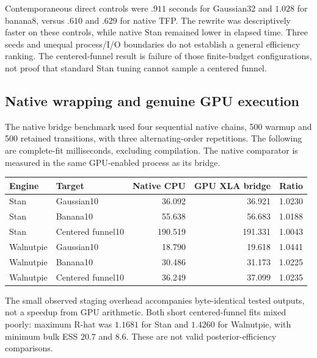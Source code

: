 Contemporaneous direct controls were $.911$ seconds for Gaussian32 and
$1.028$ for banana8, versus $.610$ and $.629$ for native TFP. The rewrite
was descriptively faster on these controls, while native Stan remained
lower in elapsed time. Three seeds and unequal process/I/O boundaries do
not establish a general efficiency ranking. The centered-funnel result is
failure of those finite-budget configurations, not proof that standard Stan
tuning cannot sample a centered funnel.

\subsection{Native wrapping and genuine GPU execution}

The native bridge benchmark used four sequential native chains, 500 warmup
and 500 retained transitions, with three alternating-order repetitions.
The following are complete-fit milliseconds, excluding compilation. The
native comparator is measured in the same GPU-enabled process as its bridge.

\begin{center}\small
\begin{tabular}{llrrr}
\toprule
Engine & Target & Native CPU & GPU XLA bridge & Ratio\\
\midrule
Stan & Gaussian10 & 36.092 & 36.921 & 1.0230\\
Stan & Banana10 & 55.638 & 56.683 & 1.0188\\
Stan & Centered funnel10 & 190.519 & 191.331 & 1.0043\\
Walnutpie & Gaussian10 & 18.790 & 19.618 & 1.0441\\
Walnutpie & Banana10 & 30.486 & 31.173 & 1.0225\\
Walnutpie & Centered funnel10 & 36.249 & 37.099 & 1.0235\\
\bottomrule
\end{tabular}
\end{center}

The small observed staging overhead accompanies byte-identical tested
outputs, not a speedup from GPU arithmetic. Both short centered-funnel
fits mixed poorly: maximum R-hat was $1.1681$ for Stan and $1.4260$ for
Walnutpie, with minimum bulk ESS $20.7$ and $8.6$. These are not valid
posterior-efficiency comparisons.

